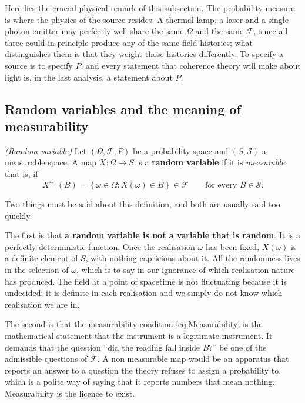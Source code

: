 		Here lies the crucial physical remark of this subsection. The probability
		measure is where the physics of the source resides. A thermal lamp, a laser and a
		single photon emitter may perfectly well share the same $\Omega$ and the same
		$\mathcal{F}$, since all three could in principle produce any of the same field
		histories; what distinguishes them is that they weight those histories differently. To
		specify a source is to specify $P$, and every statement that coherence theory will make
		about light is, in the last analysis, a statement about $P$.

	\subsection{Random variables and the meaning of measurability}

		\begin{myDef}
			\textit{(Random variable)} Let $(\Omega,\mathcal{F},P)$ be a probability space and
			$(S,\mathcal{S})$ a measurable space. A map $X:\Omega\to S$ is a
			\textbf{random variable} if it is \emph{measurable}, that is, if
			\begin{equation}\label{eq:Measurability}
				X^{-1}(B) = \left\{\omega\in\Omega : X(\omega)\in B\right\}\in\mathcal{F}
				\qquad\text{for every } B\in\mathcal{S}.
			\end{equation}
		\end{myDef}

		Two things must be said about this definition, and both are usually said too quickly.

		The first is that \textbf{a random variable is not a variable that is random}. It is a
		perfectly deterministic function. Once the realisation $\omega$ has been fixed,
		$X(\omega)$ is a definite element of $S$, with nothing capricious about it. All the
		randomness lives in the selection of $\omega$, which is to say in our ignorance of which
		realisation nature has produced. The field at a point of spacetime is not fluctuating
		because it is undecided; it is definite in each realisation and we simply do not know
		which realisation we are in.

		The second is that the measurability condition \eqref{eq:Measurability} is the
		mathematical statement that the instrument is a legitimate instrument. It
		demands that the question ``did the reading fall inside $B$?'' be one of the admissible
		questions of $\mathcal{F}$. A non measurable map would be an apparatus that reports an
		answer to a question the theory refuses to assign a probability to, which is a polite
		way of saying that it reports numbers that mean nothing. Measurability is the licence to
		exist.

